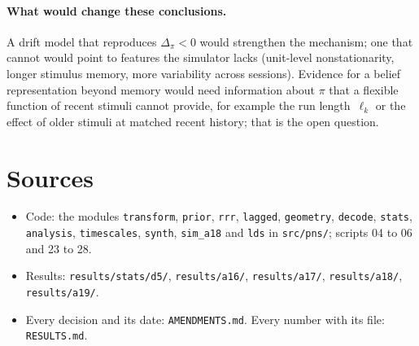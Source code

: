 \documentclass[11pt]{article}
\begin{document}
\paragraph{What would change these conclusions.} A drift model that reproduces $\Delta_\pi < 0$ would strengthen the
mechanism; one that cannot would point to features the simulator lacks (unit-level nonstationarity, longer stimulus
memory, more variability across sessions). Evidence for a belief representation beyond memory would need information
about $\pi$ that a flexible function of recent stimuli cannot provide, for example the run length~$\ell_k$ or the
effect of older stimuli at matched recent history; that is the open question.

\section*{Sources}
\begin{itemize}
\item Code: the modules \texttt{transform}, \texttt{prior}, \texttt{rrr}, \texttt{lagged}, \texttt{geometry},
  \texttt{decode}, \texttt{stats}, \texttt{analysis}, \texttt{timescales}, \texttt{synth}, \texttt{sim\_a18} and
  \texttt{lds} in \texttt{src/pns/}; scripts 04 to 06 and 23 to 28.
\item Results: \texttt{results/stats/d5/}, \texttt{results/a16/}, \texttt{results/a17/}, \texttt{results/a18/},
  \texttt{results/a19/}.
\item Every decision and its date: \texttt{AMENDMENTS.md}. Every number with its file: \texttt{RESULTS.md}.
\end{itemize}
\end{document}
